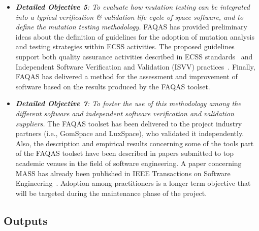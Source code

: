 \begin{itemize}
\item {\emph{\textbf{Detailed Objective 5}: To evaluate how mutation testing can be integrated into a typical verification \& validation life cycle of space software, and to define the mutation testing methodology.}} FAQAS has provided preliminary ideas about the definition of guidelines for the adoption of mutation analysis and testing strategies within ECSS activities. The proposed guidelines support both quality assurance activities described in ECSS standards~\cite{ecss40C,ecss80C} and Independent Software Verification and Validation (ISVV) practices~\cite{ESAISVV}. Finally, FAQAS has delivered a method for the assessment and improvement of software based on the results produced by the FAQAS toolset.

\item {\emph{\textbf{Detailed Objective 7}: To foster the use of this methodology among the different software and independent software verification and validation suppliers.}} The FAQAS toolset has been delivered to the project industry partners (i.e., GomSpace and LuxSpace), who validated it independently. Also, the description and empirical results concerning some of the tools part of the FAQAS toolset have been described in papers submitted to top academic venues in the field of software engineering. A paper concerning MASS has already been published in IEEE Transactions on Software Engineering~\cite{Oscar:MASS:TSE}. Adoption among practitioners is a longer term objective that will be targeted during the maintenance phase of the project.

\end{itemize}



\subsection{Outputs}

